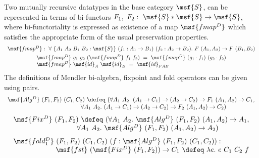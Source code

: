 \documentclass[submission,copyright,creativecommons]{eptcs}
\newcounter{prop}
\begin{document}
Two mutually recursive datatypes in the base category $\msf{S}$, can
be represented in terms of bi-functors $F_1, \ F_2: \ \msf{S} *
\msf{S} \to \msf{S}$, where bi-functoriality is expressed as existence
of a map $\msf{fmap^D}$ which satisfies the appropriate form of the
usual preservation properties.
\begin{gather}  
\begin{array}{lll}
\msf{fmap^D} : \ \forall \ \{A_1 \ A_2 \ B_1 \ B_2: \msf{S} \}
\ (f_1: A_1 \to B_1) \ (f_2: A_2 \to B_2). \
F \ (A_1, A_2) \to F \ (B_1, B_2)
\end{array} \\
\begin{array}{lll}
\msf{fmap^D} \ g_1 \ g_2 \ (\msf{fmap^D} \ f_1 \ f_2) \ = \ 
\msf{fmap^D} \ (g_1 \cdot f_1) \ (g_2 \cdot f_2) \\
\msf{fmap^D} \ \msf{id}_A \ \msf{id}_B \ = \ \msf{id}_{F A B}
\end{array}
 \end{gather} 
The definitions of Mendler bi-algebra, fixpoint and fold operators can
be given using pairs.
\begin{gather}  
\begin{array}{lll}
\msf{Alg^{D}} \ (F_1, F_2) \ (C_1, C_2) \ \defeq \  
( \forall A_1 \ A_2. \ (A_1 \to C_1) \to (A_2 \to C_2) \to F_1
\ (A_1, A_2) \to C_1,\\ 
\qquad \qquad \qquad \qquad \qquad \qquad \ \forall A_1
\ A_2. \ (A_1 \to C_1) \to (A_2 \to C_2) \to F_2 \ (A_1, A_2) \to C_2)
\end{array}
 \end{gather} 
\begin{gather}  
\begin{array}{lll}
\msf{Fix^D} \ (F_1, F_2) \ \defeq \ (\forall A_1 \ A_2. \ \msf{Alg^D}
\ (F_1, F_2) \ (A_1, A_2) \to A_1,  \\ 
\qquad \qquad \quad \qquad \qquad 
\forall A_1 \ A_2. \ \msf{Alg^D} \ (F_1, F_2) \ (A_1, A_2) \to A_2) 
\end{array}
\end{gather} 
\begin{gather} 
\begin{array}{lll}
\msf{fold^D_1} \ (F_1, F_2) \ (C_1, C_2) \ (f: \msf{Alg^D} \ (F_1,
F_2) \ (C_1, C_2)): \\ 
\qquad \qquad \qquad 
\msf{fst} \ (\msf{Fix^D} \ (F_1, F_2)) \to C_1
\ \defeq \ \lambda e. \ e \ C_1 \ C_2 \ f
\end{array}
\end{gather} 
\end{document}
